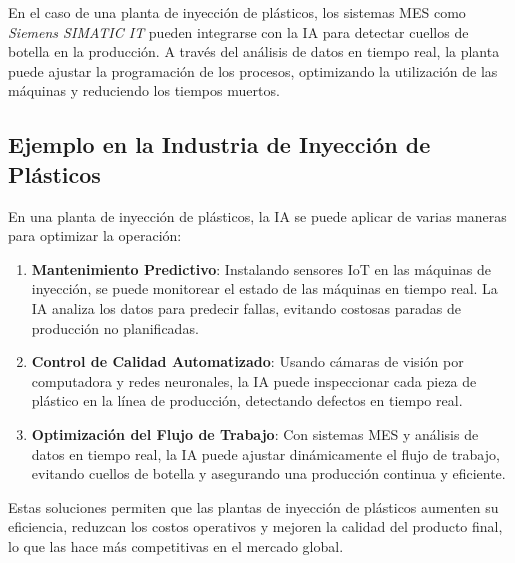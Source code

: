 
En el caso de una planta de inyección de plásticos, los sistemas MES como \textit{Siemens SIMATIC IT} pueden integrarse con la IA para detectar cuellos de botella en la producción. A través del análisis de datos en tiempo real, la planta puede ajustar la programación de los procesos, optimizando la utilización de las máquinas y reduciendo los tiempos muertos.

\subsection{Ejemplo en la Industria de Inyección de Plásticos}

En una planta de inyección de plásticos, la IA se puede aplicar de varias maneras para optimizar la operación:

\begin{enumerate}
    \item \textbf{Mantenimiento Predictivo}: Instalando sensores IoT en las máquinas de inyección, se puede monitorear el estado de las máquinas en tiempo real. La IA analiza los datos para predecir fallas, evitando costosas paradas de producción no planificadas.
    \item \textbf{Control de Calidad Automatizado}: Usando cámaras de visión por computadora y redes neuronales, la IA puede inspeccionar cada pieza de plástico en la línea de producción, detectando defectos en tiempo real.
    \item \textbf{Optimización del Flujo de Trabajo}: Con sistemas MES y análisis de datos en tiempo real, la IA puede ajustar dinámicamente el flujo de trabajo, evitando cuellos de botella y asegurando una producción continua y eficiente.
\end{enumerate}

Estas soluciones permiten que las plantas de inyección de plásticos aumenten su eficiencia, reduzcan los costos operativos y mejoren la calidad del producto final, lo que las hace más competitivas en el mercado global.

